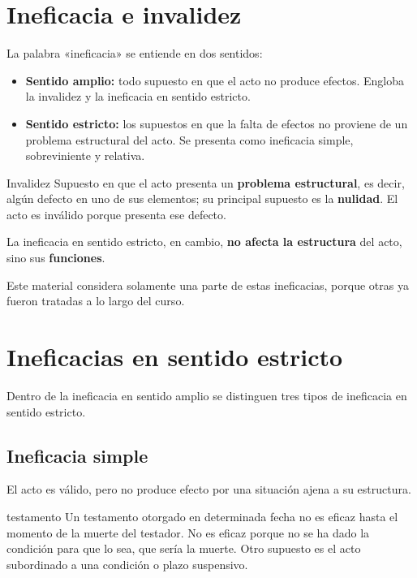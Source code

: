 \documentclass[12pt,oneside]{book}
\begin{document}
\section{Ineficacia e invalidez}

La palabra «ineficacia» se entiende en dos sentidos:

\begin{itemize}
    \item \textbf{Sentido amplio:} todo supuesto en que el acto no produce efectos. Engloba la invalidez y la ineficacia en sentido estricto.
    \item \textbf{Sentido estricto:} los supuestos en que la falta de efectos no proviene de un problema estructural del acto. Se presenta como ineficacia simple, sobreviniente y relativa.
\end{itemize}

\begin{definition}{Invalidez}
Supuesto en que el acto presenta un \textbf{problema estructural}, es decir, algún defecto en uno de sus elementos; su principal supuesto es la \textbf{nulidad}. El acto es inválido porque presenta ese defecto.
\end{definition}

La ineficacia en sentido estricto, en cambio, \textbf{no afecta la estructura} del acto, sino sus \textbf{funciones}.

Este material considera solamente una parte de estas ineficacias, porque otras ya fueron tratadas a lo largo del curso.

\section{Ineficacias en sentido estricto}

Dentro de la ineficacia en sentido amplio se distinguen tres tipos de ineficacia en sentido estricto.

\subsection{Ineficacia simple}

El acto es válido, pero no produce efecto por una situación ajena a su estructura.

\begin{example}{testamento}
Un testamento otorgado en determinada fecha no es eficaz hasta el momento de la muerte del testador. No es eficaz porque no se ha dado la condición para que lo sea, que sería la muerte. Otro supuesto es el acto subordinado a una condición o plazo suspensivo.
\end{example}
\end{document}
